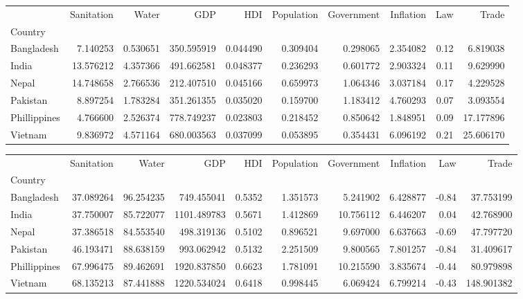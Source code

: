 \documentclass{article}
\begin{document}
\begin{landscape}

\begin{tabular}{lrrrrrrrrr}
\toprule
\caption{\textbf{Table 1}}
\label{fig:universe}
{} &  Sanitation &     Water &         GDP &       HDI &  Population &  Government &  Inflation &       Law &      Trade \\
Country      &             &           &             &           &             &             &            &           &            \\
Bangladesh   &    7.140253 &  0.530651 &  350.595919 &  0.044490 &    0.309404 &    0.298065 &   2.354082 &  0.12 &   6.819038 \\
India        &   13.576212 &  4.357366 &  491.662581 &  0.048377 &    0.236293 &    0.601772 &   2.903324 &  0.11 &   9.629990 \\
Nepal        &   14.748658 &  2.766536 &  212.407510 &  0.045166 &    0.659973 &    1.064346 &   3.037184 &  0.17 &   4.229528 \\
Pakistan     &    8.897254 &  1.783284 &  351.261355 &  0.035020 &    0.159700 &    1.183412 &   4.760293 &  0.07 &   3.093554 \\
Phillippines &    4.766600 &  2.526374 &  778.749237 &  0.023803 &    0.218452 &    0.850642 &   1.848951 &  0.09 &  17.177896 \\
Vietnam      &    9.836972 &  4.571164 &  680.003563 &  0.037099 &    0.053895 &    0.354431 &   6.096192 &  0.21 &  25.606170 \\
\bottomrule
\end{tabular}


\begin{tabular}{lrrrrrrrrr}
\toprule
\caption{\textbf{Table 2}}
\label{fig:universe}
{} &  Sanitation &      Water &          GDP &       HDI &  Population &  Government &  Inflation &       Law &       Trade \\
Country      &             &            &              &           &             &             &            &           &             \\
\midrule
Bangladesh   &   37.089264 &  96.254235 &   749.455041 &  0.5352 &    1.351573 &    5.241902 &   6.428877 & -0.84 &   37.753199 \\
India        &   37.750007 &  85.722077 &  1101.489783 &  0.5671 &    1.412869 &   10.756112 &   6.446207 &  0.04 &   42.768900 \\
Nepal        &   37.386518 &  84.553540 &   498.319136 &  0.5102 &    0.896521 &    9.697000 &   6.637663 & -0.69 &   47.797720 \\
Pakistan     &   46.193471 &  88.638159 &   993.062942 &  0.5132 &    2.251509 &    9.800565 &   7.801257 & -0.84 &   31.409617 \\
Phillippines &   67.996475 &  89.462691 &  1920.837850 &  0.6623 &    1.781091 &   10.215590 &   3.835674 & -0.44 &   80.979898 \\
Vietnam      &   68.135213 &  87.441888 &  1220.534024 &  0.6418 &    0.998445 &    6.069424 &   6.799214 & -0.43 &  148.901382 \\
\bottomrule
\end{tabular}


\end{landscape}
\end{document}
